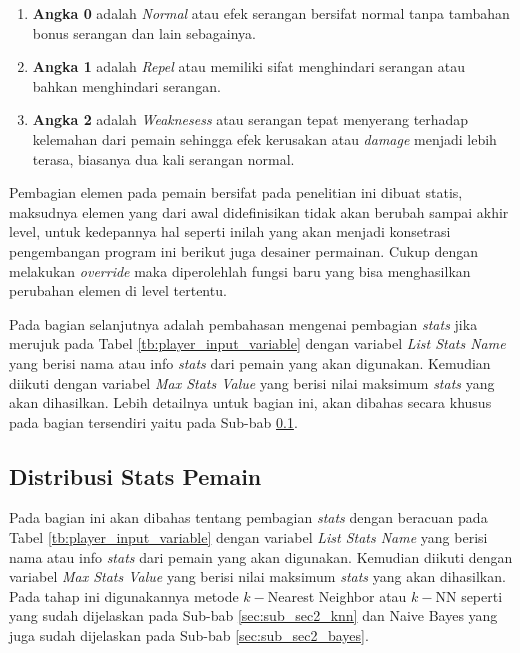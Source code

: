 \begin{enumerate}[label=\alph*).]
	\item \textbf{Angka 0} adalah \textit{Normal} atau efek serangan bersifat normal tanpa tambahan bonus serangan dan lain sebagainya.
	\item \textbf{Angka 1} adalah \textit{Repel} atau memiliki sifat menghindari serangan atau bahkan menghindari serangan.
	\item \textbf{Angka 2} adalah \textit{Weaknesess} atau serangan tepat menyerang terhadap kelemahan dari pemain sehingga efek kerusakan atau \textit{damage} menjadi lebih terasa, biasanya dua kali serangan normal. 
\end{enumerate}

Pembagian elemen pada pemain bersifat pada penelitian ini dibuat statis, maksudnya elemen yang dari awal didefinisikan tidak akan berubah sampai akhir level, untuk kedepannya hal seperti inilah yang akan menjadi konsetrasi pengembangan program ini berikut juga desainer permainan. Cukup dengan melakukan \textit{override} maka diperolehlah fungsi baru yang bisa menghasilkan perubahan elemen di level tertentu.
\vspace{1ex}

Pada bagian selanjutnya adalah pembahasan mengenai pembagian \textit{stats} jika merujuk pada Tabel \ref{tb:player_input_variable} dengan variabel \textit{List Stats Name} yang berisi nama atau info \textit{stats} dari pemain yang akan digunakan. Kemudian diikuti dengan variabel \textit{Max Stats Value} yang berisi nilai maksimum \textit{stats} yang akan dihasilkan. Lebih detailnya untuk bagian ini, akan dibahas secara khusus pada bagian tersendiri yaitu pada Sub-bab \ref{sec:sub_sec3_stat_pemain}.
\vspace{1ex}

\subsection{Distribusi Stats Pemain}
\label{sec:sub_sec3_stat_pemain}
\vspace{1ex}

Pada bagian ini akan dibahas tentang pembagian \textit{stats} dengan beracuan pada Tabel \ref{tb:player_input_variable} dengan variabel \textit{List Stats Name} yang berisi nama atau info \textit{stats} dari pemain yang akan digunakan. Kemudian diikuti dengan variabel \textit{Max Stats Value} yang berisi nilai maksimum \textit{stats} yang akan dihasilkan. Pada tahap ini digunakannya metode $k-$Nearest Neighbor atau $k-$NN seperti yang sudah dijelaskan pada Sub-bab \ref{sec:sub_sec2_knn} dan Naive Bayes yang juga sudah dijelaskan pada Sub-bab \ref{sec:sub_sec2_bayes}. 
\vspace{1ex}

